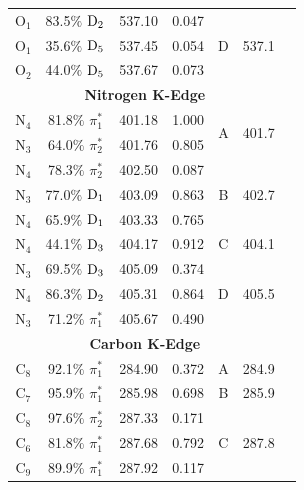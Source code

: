 \documentclass[12pt]{article}
\begin{document}
\begin{table}[!t]
\begin{tabular*}{8.5cm}{@{\extracolsep{\fill} }cccrccc}
    O$_1$
 &   83.5$\%$ $\rm D_2$  & 537.10 & 0.047 & \multirow{3}{*}{D} & \multirow{3}{*}{537.1} \\
    O$_1$
 &   35.6$\%$ $\rm D_5$  & 537.45 & 0.054 \\
    O$_2$
 &   44.0$\%$ $\rm D_5$  & 537.67 & 0.073 \vspace{0.05in}\\
  \multicolumn{6}{c}{\textbf{Nitrogen K-Edge}} \vspace{0.05in}\\
     N$_4$
 &   81.8$\%$ $\pi_1^*$  & 401.18 & 1.000 & \multirow{2}{*}{A} & \multirow{2}{*}{401.7} \\
    N$_3$
 &   64.0$\%$ $\pi_2^*$  & 401.76 & 0.805 
 \vspace{0.05in}\\
    N$_4$
 &   78.3$\%$ $\pi_2^*$  & 402.50 & 0.087 & \multirow{3}{*}{B} & \multirow{3}{*}{402.7}\\
    N$_3$
 &   77.0$\%$ $\rm D_1$  & 403.09 & 0.863 \\
    N$_4$
 &   65.9$\%$ $\rm D_1$  & 403.33 & 0.765 
 \vspace{0.05in}\\
    N$_4$
 &   44.1$\%$ $\rm D_3$  & 404.17 & 0.912 & C & 404.1 
 \vspace{0.05in}\\
    N$_3$
 &   69.5$\%$ $\rm D_3$  & 405.09 & 0.374  & \multirow{3}{*}{D} & \multirow{3}{*}{405.5} \\
    N$_4$
 &   86.3$\%$ $\rm D_2$  & 405.31 & 0.864 \\
    N$_3$
 &   71.2$\%$ $\pi_1^*$  & 405.67 & 0.490 \vspace{0.05in}\\
   \multicolumn{6}{c}{\textbf{Carbon K-Edge}} \vspace{0.05in}\\
       C$_8$
 &   92.1$\%$ $\pi_1^*$  & 284.90 & 0.372 & A & 284.9  
 \vspace{0.05in} \\
    C$_7$
 &   95.9$\%$ $\pi_1^*$  & 285.98 & 0.698 & B & 285.9
 \vspace{0.05in} \\
    C$_8$
 &   97.6$\%$ $\pi_2^*$  & 287.33 & 0.171   & \multirow{3}{*}{C} & \multirow{3}{*}{287.8}  \\
    C$_6$
 &   81.8$\%$ $\pi_1^*$  & 287.68 & 0.792 \\
    C$_9$
 &   89.9$\%$ $\pi_1^*$  & 287.92 & 0.117  
 \vspace{0.05in}  \\

\end{tabular*}
\end{table}
\end{document}

